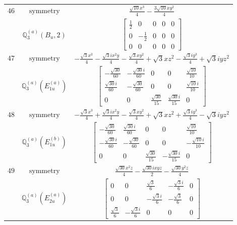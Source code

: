 \documentclass[fleqn,8pt,landscape]{jsarticle}
\begin{document}
\begin{longtable}{ccc}
$ 46 $ & $ \text{symmetry} $ & $ \frac{\sqrt{10} x^{3}}{4} - \frac{3 \sqrt{10} x y^{2}}{4} $ \\
$  $ & $ \mathbb{Q}_{3}^{(a)}(B_{u},2) $ & $ \begin{bmatrix} \frac{1}{2} & 0 & 0 & 0 & 0 \\ 0 & - \frac{1}{2} & 0 & 0 & 0 \\ 0 & 0 & 0 & 0 & 0 \end{bmatrix} $ \\ \hline
$ 47 $ & $ \text{symmetry} $ & $ - \frac{\sqrt{3} x^{3}}{4} - \frac{\sqrt{3} i x^{2} y}{4} - \frac{\sqrt{3} x y^{2}}{4} + \sqrt{3} x z^{2} - \frac{\sqrt{3} i y^{3}}{4} + \sqrt{3} i y z^{2} $ \\
$  $ & $ \mathbb{Q}_{3}^{(a)}(E_{1u}^{(a)}) $ & $ \begin{bmatrix} - \frac{\sqrt{30}}{60} & - \frac{\sqrt{30} i}{60} & 0 & 0 & \frac{\sqrt{10}}{10} \\ \frac{\sqrt{30} i}{60} & - \frac{\sqrt{30}}{60} & 0 & 0 & \frac{\sqrt{10} i}{10} \\ 0 & 0 & \frac{\sqrt{30}}{15} & \frac{\sqrt{30} i}{15} & 0 \end{bmatrix} $ \\ \hline
$ 48 $ & $ \text{symmetry} $ & $ - \frac{\sqrt{3} x^{3}}{4} + \frac{\sqrt{3} i x^{2} y}{4} - \frac{\sqrt{3} x y^{2}}{4} + \sqrt{3} x z^{2} + \frac{\sqrt{3} i y^{3}}{4} - \sqrt{3} i y z^{2} $ \\
$  $ & $ \mathbb{Q}_{3}^{(a)}(E_{1u}^{(b)}) $ & $ \begin{bmatrix} - \frac{\sqrt{30}}{60} & \frac{\sqrt{30} i}{60} & 0 & 0 & \frac{\sqrt{10}}{10} \\ - \frac{\sqrt{30} i}{60} & - \frac{\sqrt{30}}{60} & 0 & 0 & - \frac{\sqrt{10} i}{10} \\ 0 & 0 & \frac{\sqrt{30}}{15} & - \frac{\sqrt{30} i}{15} & 0 \end{bmatrix} $ \\ \hline
$ 49 $ & $ \text{symmetry} $ & $ \frac{\sqrt{30} x^{2} z}{4} - \frac{\sqrt{30} i x y z}{2} - \frac{\sqrt{30} y^{2} z}{4} $ \\
$  $ & $ \mathbb{Q}_{3}^{(a)}(E_{2u}^{(a)}) $ & $ \begin{bmatrix} 0 & 0 & \frac{\sqrt{3}}{6} & - \frac{\sqrt{3} i}{6} & 0 \\ 0 & 0 & - \frac{\sqrt{3} i}{6} & - \frac{\sqrt{3}}{6} & 0 \\ \frac{\sqrt{3}}{6} & - \frac{\sqrt{3} i}{6} & 0 & 0 & 0 \end{bmatrix} $ \\ \hline

\end{longtable}
\end{document}
